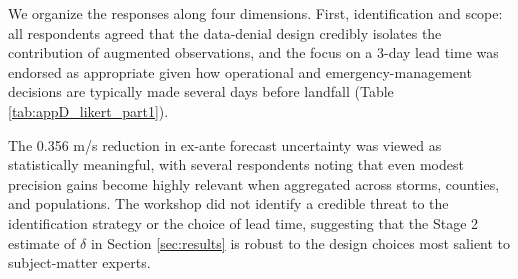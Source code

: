 \documentclass[12pt]{article}%
\begin{document}
\begin{appendices}
We organize the responses along four dimensions. First, identification and scope: all respondents agreed that the data-denial design credibly isolates the contribution of augmented observations, and the focus on a 3-day lead time was endorsed as appropriate given how operational and emergency-management decisions are typically made several days before landfall (Table \ref{tab:appD_likert_part1}). 

The 0.356 m/s reduction in ex-ante forecast uncertainty was viewed as statistically meaningful, with several respondents noting that even modest precision gains become highly relevant when aggregated across storms, counties, and populations. The workshop did not identify a credible threat to the identification strategy or the choice of lead time, suggesting that the Stage 2 estimate of $\delta$ in Section \ref{sec:results} is robust to the design choices most salient to subject-matter experts.



\begin{landscape}


\end{landscape}





\end{appendices}
\end{document}
